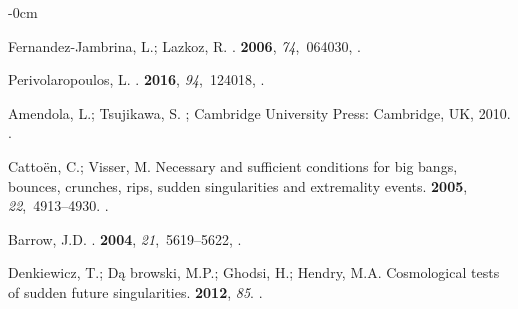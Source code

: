 \documentclass[universe,article,accept,moreauthors,pdftex]{Definitions/mdpi}
\begin{document}
\begin{adjustwidth}{-\extralength}{0cm}
\begin{thebibliography}{999}
Fernandez-Jambrina, L.; Lazkoz, R.
.
 {\bf 2006}, {\em 74},~064030,
{\href{https://doi.org/10.1103/PhysRevD.74.064030}{}}.

Perivolaropoulos, L.
.
 {\bf 2016}, {\em 94},~124018,
{\href{https://doi.org/10.1103/PhysRevD.94.124018}{}}.

Amendola, L.; Tsujikawa, S.
; Cambridge University
  Press: Cambridge, UK,   2010.
\newblock
{\href{https://doi.org/10.1017/CBO9780511750823}{}}.

Cattoën, C.; Visser, M.
\newblock Necessary and sufficient conditions for big bangs, bounces, crunches,
  rips, sudden singularities and extremality events.
 {\bf 2005}, {\em 22},~4913--4930.
\newblock
{\href{https://doi.org/10.1088/0264-9381/22/23/001}{}}.

Barrow, J.D.
.
 {\bf 2004}, {\em 21},~5619--5622,
{\href{https://doi.org/10.1088/0264-9381/21/23/020}{}}.

Denkiewicz, T.; D{\k{a} }browski, M.P.; Ghodsi, H.; Hendry, M.A.
\newblock Cosmological tests of sudden future singularities.
 {\bf 2012}, {\em 85}.
\newblock
{\href{https://doi.org/10.1103/physrevd.85.083527}{}}.


\end{thebibliography}
\end{adjustwidth}
\end{document}
